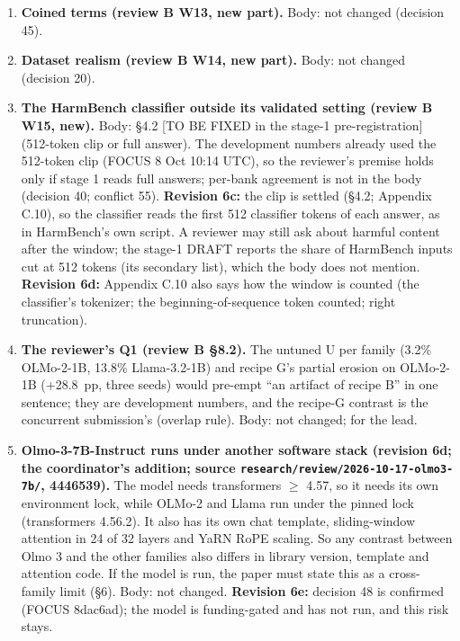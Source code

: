 \documentclass{article}
\theoremstyle{plain}
\theoremstyle{definition}
\theoremstyle{remark}
\begin{document}
\begin{enumerate}
        \textbf{Revision 6c (the lead's ruling 2):} \S{}6 now says it in one
        plain sentence (dropped during development at $10^{-4}$, before the
        per-family rule existed, not retried at a lower rate; the concurrent
        submission's Qwen runs are the only later evidence), and \S{}4.1 points
        to \S{}6.
  \item \textbf{Coined terms (review B W13, new part).} Body: not changed
        (decision 45).
  \item \textbf{Dataset realism (review B W14, new part).} Body: not changed
        (decision 20).
  \item \textbf{The HarmBench classifier outside its validated setting (review B
        W15, new).} Body: \S{}4.2 [TO BE FIXED in the stage-1 pre-registration]
        (512-token clip or full answer). The development numbers already used
        the 512-token clip (FOCUS 8 Oct 10:14 UTC), so the reviewer's premise
        holds only if stage 1 reads full answers; per-bank agreement is not in
        the body (decision 40; conflict 55). \textbf{Revision 6c:} the clip is
        settled (\S{}4.2; Appendix C.10), so the classifier reads the first 512
        classifier tokens of each answer, as in HarmBench's own script. A
        reviewer may still ask about harmful content after the window; the
        stage-1 DRAFT reports the share of HarmBench inputs cut at 512 tokens
        (its secondary list), which the body does not mention. \textbf{Revision
        6d:} Appendix C.10 also says how the window is counted (the classifier's
        tokenizer; the beginning-of-sequence token counted; right truncation).
  \item \textbf{The reviewer's Q1 (review B \S{}8.2).} The untuned U per family
        (3.2\% OLMo-2-1B, 13.8\% Llama-3.2-1B) and recipe G's partial erosion on
        OLMo-2-1B (+28.8~pp, three seeds) would pre-empt ``an artifact of recipe
        B'' in one sentence; they are development numbers, and the recipe-G
        contrast is the concurrent submission's (overlap rule). Body: not
        changed; for the lead.
  \item \textbf{Olmo-3-7B-Instruct runs under another software stack (revision
        6d; the coordinator's addition; source
        \nolinkurl{research/review/2026-10-17-olmo3-7b/}, 4446539).} The model
        needs transformers $\ge$ 4.57, so it needs its own environment lock,
        while OLMo-2 and Llama run under the pinned lock (transformers 4.56.2).
        It also has its own chat template, sliding-window attention in 24 of 32
        layers and YaRN RoPE scaling. So any contrast between Olmo 3 and the
        other families also differs in library version, template and attention
        code. If the model is run, the paper must state this as a cross-family
        limit (\S{}6). Body: not changed. \textbf{Revision 6e:} decision 48 is
        confirmed (FOCUS 8dac6ad); the model is funding-gated and has not run,
        and this risk stays.
\end{enumerate}
\end{document}
